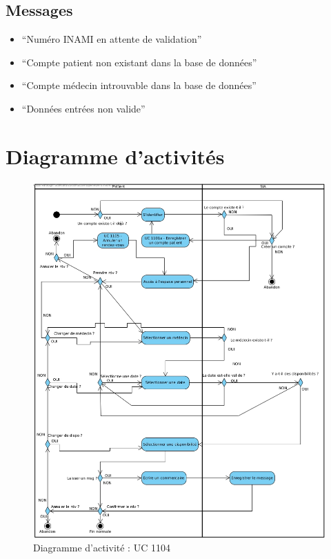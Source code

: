 \documentclass[a4paper, 11pt]{report}
\begin{document}
\subsection{Messages}
\begin{itemize}
	\item ``Numéro INAMI en attente de validation''
	\item ``Compte patient non existant dans la base de données''
	\item ``Compte médecin introuvable dans la base de données''
	\item ``Données entrées non valide''
\end{itemize}
\newpage

\section{Diagramme d'activités}
\begin{figure}[hb]
	\centering
	\includegraphics[scale=0.4]{activiteUC1104.jpg}
	\caption{Diagramme d'activité : UC 1104}
	\label{fig:act1104}
\end{figure}
\newpage
\end{document}
